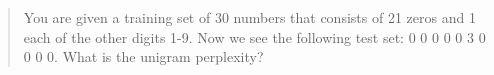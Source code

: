 \begin{quote}
You are given a training set of 30 numbers that consists of 21 zeros and 1 each of the other digits 1-9. Now we see the following test set: 0 0 0 0 0 3 0 0 0 0. What is the unigram perplexity?
\end{quote}